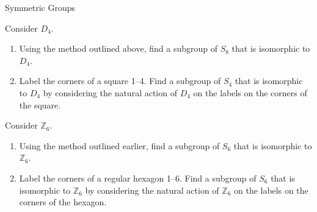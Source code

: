 \begin{section}{Symmetric Groups}
\begin{problem}
Consider $D_4$.
\begin{enumerate}[label=\rm{(\alph*)}]
\item Using the method outlined above, find a subgroup of $S_8$ that is isomorphic to $D_4$.
\item Label the corners of a square 1--4. Find a subgroup of $S_4$ that is isomorphic to $D_4$ by considering the natural action of $D_4$ on the labels on the corners of the square.
\end{enumerate}
\end{problem}

\begin{problem}
Consider $\mathbb{Z}_6$.
\begin{enumerate}[label=\rm{(\alph*)}]
\item Using the method outlined earlier, find a subgroup of $S_6$ that is isomorphic to $\mathbb{Z}_6$.
\item Label the corners of a regular hexagon 1--6. Find a subgroup of $S_6$ that is isomorphic to $\mathbb{Z}_6$ by considering the natural action of $\mathbb{Z}_6$ on the labels on the corners of the hexagon.
\end{enumerate}
\end{problem}

\end{section}

